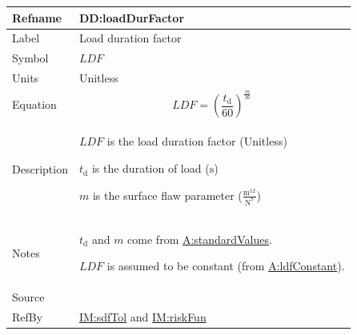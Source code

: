 \documentclass[12pt]{article}
\begin{document}
\medskip
\noindent
\begin{minipage}{\textwidth}
\begin{tabular}{>{\raggedright}p{}>{\raggedright\arraybackslash}p{}}
\toprule \textbf{Refname} & \textbf{DD:loadDurFactor}
\label{DD:loadDurFactor}
\\ \midrule
Label & Load duration factor
        
\\ \midrule
Symbol & $\mathit{LDF}$
         
\\ \midrule
Units & Unitless
        
\\ \midrule
Equation & \begin{displaymath}
           \mathit{LDF}=\left(\frac{{t_{\text{d}}}}{60}\right)^{\frac{m}{16}}
           \end{displaymath}
\\ \midrule
Description & \begin{symbDescription}
              \item{$\mathit{LDF}$ is the load duration factor (Unitless)}
              \item{${t_{\text{d}}}$ is the duration of load (${\text{s}}$)}
              \item{$m$ is the surface flaw parameter ($\frac{\text{m}^{12}}{\text{N}^{7}}$)}
              \end{symbDescription}
\\ \midrule
Notes & ${t_{\text{d}}}$ and $m$ come from \hyperref[assumpSV]{A:standardValues}.
        
        $\mathit{LDF}$ is assumed to be constant (from \hyperref[assumpLDFC]{A:ldfConstant}).
        
\\ \midrule
Source & \cite{astm2009}
         
\\ \midrule
RefBy & \hyperref[IM:sdfTol]{IM:sdfTol} and \hyperref[IM:riskFun]{IM:riskFun}
        
\\ \bottomrule
\end{tabular}
\end{minipage}
\end{document}
